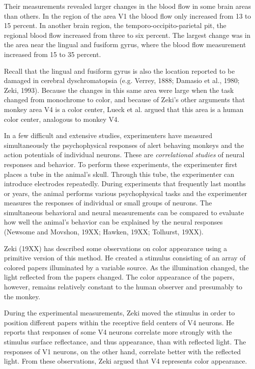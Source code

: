 Their measurements revealed larger changes in the blood flow in some
brain areas than others.  In the region of the area V1 the blood flow
only increased from 13 to 15 percent.  In another brain region, the
temporo-occipito-parietal pit, the regional blood flow increased from
three to six percent.  The largest change was in the area near the
lingual and fusiform gyrus, where the blood flow measurement increased
from 15 to 35 percent.

Recall that the lingual and fusiform gyrus is also the location
reported to be damaged in cerebral dyschromatopsia (e.g.  Verrey,
1888; Damasio et al., 1980; Zeki, 1993).  Because the changes in this
same area were large when the task changed from monochrome to color,
and because of Zeki's other arguments that monkey area V4 is a color
center, Lueck et al. argued that this area is a human color center,
analogous to monkey V4.

In a few difficult and extensive studies, experimenters have measured
simultaneously the psychophysical responses of alert behaving monkeys
and the action potentials of individual neurons.  These are {\em
correlational studies} of neural responses and behavior.  To perform
these experiments, the experimenter first places a tube in the
animal's skull.  Through this tube, the experimenter can introduce
electrodes repeatedly.  During experiments that frequently last
months or years, the animal performs various psychophysical tasks and
the experimenter measures the responses of individual or small groups
of neurons.  The simultaneous behavioral and neural measurements can
be compared to evaluate how well the animal's behavior can be
explained by the neural responses (Newsome and Movshon, 19XX; Hawken,
19XX; Tolhurst, 19XX).

Zeki (19XX) has described some observations on color appearance using a
primitive version of this method.  He created a stimulus consisting of
an array of colored papers illuminated by a variable source.  As the
illumination changed, the light reflected from the papers changed.
The color appearance of the papers, however, remains relatively
constant to the human observer and presumably to the monkey.

During the experimental measurements, Zeki moved the stimulus in order
to position different papers within the receptive field centers of V4
neurons.  He reports that responses of some V4 neurons correlate more
strongly with the stimulus surface reflectance, and thus appearance,
than with reflected light.  The responses of V1 neurons, on the other
hand, correlate better with the reflected light.  From these
observations, Zeki argued that V4 represents color appearance.

